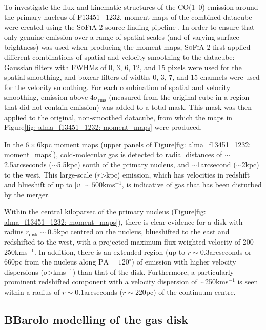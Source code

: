 To investigate the flux and kinematic structures of the CO(1--0) emission around the primary nucleus of F13451+1232, moment maps of the combined datacube were created using the \textsc{SoFiA-2} source-finding pipeline \citep{Serra2015, Serra2021}. In order to ensure that only genuine emission over a range of spatial scales (and of varying surface brightness) was used when producing the moment maps, \textsc{SoFiA-2} first applied different combinations of spatial and velocity smoothing to the datacube: Gaussian filters with FWHMs of 0, 3, 6, 12, and 15 pixels were used for the spatial smoothing, and boxcar filters of widths 0, 3, 7, and 15 channels were used for the velocity smoothing. For each combination of spatial and velocity smoothing, emission above $4\sigma_\mathrm{rms}$ (measured from the original cube in a region that did not contain emission) was added to a total mask. This mask was then applied to the original, non-smoothed datacube, from which the maps in Figure\;\ref{fig: alma_f13451_1232: moment_maps} were produced. 

In the $6\times6$\;kpc moment maps (upper panels of Figure\;\ref{fig: alma_f13451_1232: moment_maps}), cold-molecular gas is detected to radial distances of $\sim$2.5\;arcseconds ($\sim$5.5\;kpc) south of the primary nucleus, and $\sim$1\;arcsecond ($\sim$2\;kpc) to the west. This large-scale ($r$\;\textgreater{}\;kpc) emission, which has velocities in redshift and blueshift of up to $|v|\sim500$\;km\;s$^{-1}$, is indicative of gas that has been disturbed by the merger.

Within the central kiloparsec of the primary nucleus (Figure\;\ref{fig: alma_f13451_1232: moment_maps}), there is clear evidence for a disk with radius $r_\mathrm{disk}\sim0.5$\;kpc centred on the nucleus, blueshifted to the east and redshifted to the west, with a projected maximum flux-weighted velocity of 200--250\;km\;s$^{-1}$. In addition, there is an extended region (up to $r\sim0.3$\;arcseconds or 660\;pc from the nucleus along $\mathrm{PA}=120^\circ$) of emission with higher velocity dispersions ($\sigma$\;\textgreater{}\;km\;s$^{-1}$) than that of the disk. Furthermore, a particularly prominent redshifted component with a velocity dispersion of $\sim$250\;km\;s$^{-1}$ is seen within a radius of $r\sim0.1$\;arcseconds ($r\sim220$\;pc) of the continuum centre.


\subsection{BBarolo modelling of the gas disk}
\label{section: alma_f13451_1232: analysis_and_results: disk}


